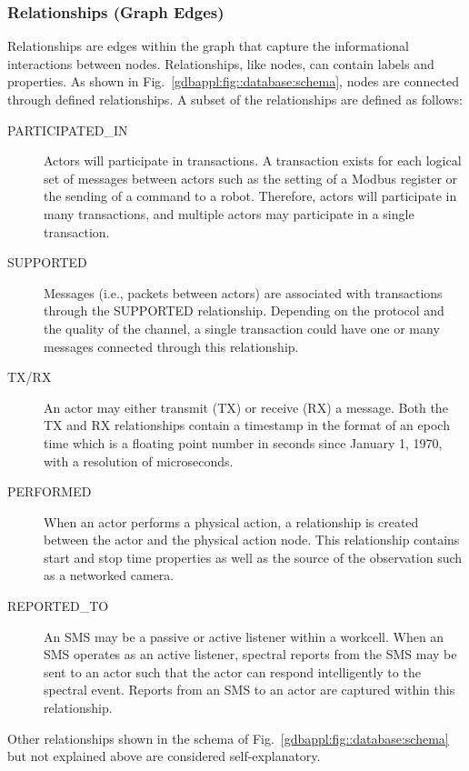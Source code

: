 \subsubsection{Relationships (Graph Edges)}
Relationships are edges within the graph that capture the informational interactions between nodes.  Relationships, like nodes, can contain labels and properties.  As shown in Fig.~\ref{gdbappl:fig::database:schema}, nodes are connected through defined relationships.  A subset of the relationships are defined as follows:
\begin{description}
    \item[PARTICIPATED\_IN] Actors will participate in transactions.  A transaction exists for each logical set of messages between actors such as the setting of a Modbus register or the sending of a command to a robot.  Therefore, actors will participate in many transactions, and multiple actors may participate in a single transaction.
    \item[SUPPORTED] Messages (i.e., packets between actors) are associated with transactions through the SUPPORTED relationship. Depending on the protocol and the quality of the channel, a single transaction could have one or many messages connected through this relationship.
    \item[TX/RX] An actor may either transmit (TX) or receive (RX) a message. Both the TX and RX relationships contain a timestamp in the format of an epoch time which is a floating point number in seconds since January 1, 1970, with a resolution of microseconds.
    \item[PERFORMED] When an actor performs a physical action, a relationship is created between the actor and the physical action node. This relationship contains start and stop time properties as well as the source of the observation such as a networked camera.
    \item[REPORTED\_TO] An SMS may be a passive or active listener within a workcell.  When an SMS operates as an active listener, spectral reports from the SMS may be sent to an actor such that the actor can respond intelligently to the spectral event.  Reports from an SMS to an actor are captured within this relationship.
\end{description}
Other relationships shown in the schema of Fig.~\ref{gdbappl:fig::database:schema} but not explained above are considered self-explanatory.

